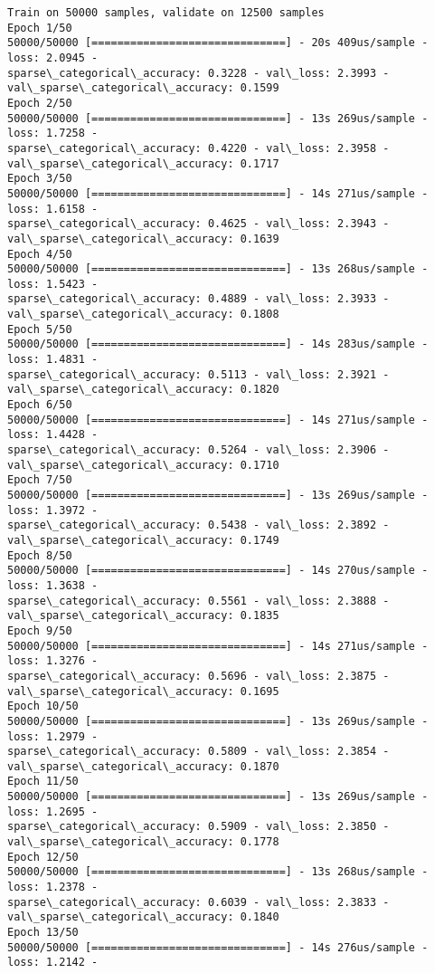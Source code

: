 \documentclass[11pt]{article}
\begin{document}
    \begin{Verbatim}[commandchars=\\\{\}]
Train on 50000 samples, validate on 12500 samples
Epoch 1/50
50000/50000 [==============================] - 20s 409us/sample - loss: 2.0945 -
sparse\_categorical\_accuracy: 0.3228 - val\_loss: 2.3993 -
val\_sparse\_categorical\_accuracy: 0.1599
Epoch 2/50
50000/50000 [==============================] - 13s 269us/sample - loss: 1.7258 -
sparse\_categorical\_accuracy: 0.4220 - val\_loss: 2.3958 -
val\_sparse\_categorical\_accuracy: 0.1717
Epoch 3/50
50000/50000 [==============================] - 14s 271us/sample - loss: 1.6158 -
sparse\_categorical\_accuracy: 0.4625 - val\_loss: 2.3943 -
val\_sparse\_categorical\_accuracy: 0.1639
Epoch 4/50
50000/50000 [==============================] - 13s 268us/sample - loss: 1.5423 -
sparse\_categorical\_accuracy: 0.4889 - val\_loss: 2.3933 -
val\_sparse\_categorical\_accuracy: 0.1808
Epoch 5/50
50000/50000 [==============================] - 14s 283us/sample - loss: 1.4831 -
sparse\_categorical\_accuracy: 0.5113 - val\_loss: 2.3921 -
val\_sparse\_categorical\_accuracy: 0.1820
Epoch 6/50
50000/50000 [==============================] - 14s 271us/sample - loss: 1.4428 -
sparse\_categorical\_accuracy: 0.5264 - val\_loss: 2.3906 -
val\_sparse\_categorical\_accuracy: 0.1710
Epoch 7/50
50000/50000 [==============================] - 13s 269us/sample - loss: 1.3972 -
sparse\_categorical\_accuracy: 0.5438 - val\_loss: 2.3892 -
val\_sparse\_categorical\_accuracy: 0.1749
Epoch 8/50
50000/50000 [==============================] - 14s 270us/sample - loss: 1.3638 -
sparse\_categorical\_accuracy: 0.5561 - val\_loss: 2.3888 -
val\_sparse\_categorical\_accuracy: 0.1835
Epoch 9/50
50000/50000 [==============================] - 14s 271us/sample - loss: 1.3276 -
sparse\_categorical\_accuracy: 0.5696 - val\_loss: 2.3875 -
val\_sparse\_categorical\_accuracy: 0.1695
Epoch 10/50
50000/50000 [==============================] - 13s 269us/sample - loss: 1.2979 -
sparse\_categorical\_accuracy: 0.5809 - val\_loss: 2.3854 -
val\_sparse\_categorical\_accuracy: 0.1870
Epoch 11/50
50000/50000 [==============================] - 13s 269us/sample - loss: 1.2695 -
sparse\_categorical\_accuracy: 0.5909 - val\_loss: 2.3850 -
val\_sparse\_categorical\_accuracy: 0.1778
Epoch 12/50
50000/50000 [==============================] - 13s 268us/sample - loss: 1.2378 -
sparse\_categorical\_accuracy: 0.6039 - val\_loss: 2.3833 -
val\_sparse\_categorical\_accuracy: 0.1840
Epoch 13/50
50000/50000 [==============================] - 14s 276us/sample - loss: 1.2142 -

\end{Verbatim}
\end{document}
